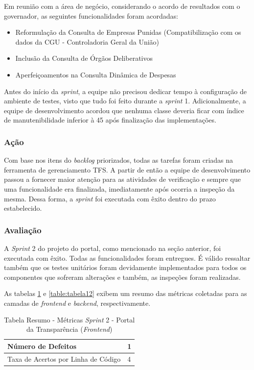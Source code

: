 Em reunião com a área de negócio, considerando o acordo de resultados com o governador, as seguintes funcionalidades foram acordadas:

\begin{itemize}
	\item Reformulação da Consulta de Empresas Punidas (Compatibilização com os dados da CGU - Controladoria Geral da União)
	\item Inclusão da Consulta de Órgãos Deliberativos
	\item Aperfeiçoamentos na Consulta Dinâmica de Despesas
\end{itemize}

Antes do início da \textit{sprint}, a equipe não precisou dedicar tempo à configuração de ambiente de testes, visto que tudo foi feito durante a \textit{sprint} 1. Adicionalmente, a equipe de desenvolvimento acordou que nenhuma classe deveria ficar com índice de manutenibilidade inferior à 45 após finalização das implementações.

\subsubsection{Ação}

Com base nos itens do \textit{backlog} priorizados, todas as tarefas foram criadas na ferramenta de gerenciamento TFS. A partir de então a equipe de desenvolvimento passou a fornecer maior atenção para as atividades de verificação e sempre que uma funcionalidade era finalizada, imediatamente após ocorria a inspeção da mesma. Dessa forma, a \textit{sprint} foi executada com êxito dentro do prazo estabelecido.

\subsubsection{Avaliação}

A \textit{Sprint} 2 do projeto do portal, como mencionado na seção anterior, foi executada com êxito. Todas as funcionalidades foram entregues. É válido ressaltar também que os testes unitários foram devidamente implementados para todos os componentes que sofreram alterações e também, as inspeções foram realizadas.

As tabelas \ref{table:tabela11} e \ref{table:tabela12} exibem um resumo das métricas coletadas para as camadas de \textit{frontend} e \textit{backend}, respectivamente.

\begin{table}[h]
\caption{Tabela Resumo - Métricas \textit{Sprint} 2 - Portal da Transparência (\textit{Frontend})}
\centering
\begin{tabular}{ | m{8cm} | m{8cm} | } 
\hline
Número de Defeitos & 1 \\ 
\hline
Taxa de Acertos por Linha de Código & 4 \\ 
\hline
\end{tabular}
\label{table:tabela11}
\end{table}

